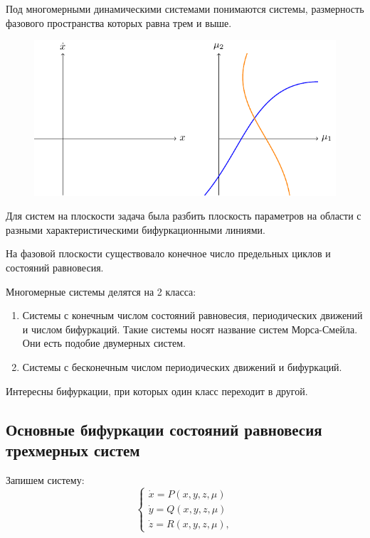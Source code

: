 Под многомерными динамическими системами понимаются системы, размерность фазового пространства которых равна трем и выше. 
\begin{figure} 
	\vspace{0.1em}
	\centering
	\includegraphics[scale=1]{fig/fig48.pdf}
	\vspace{-0.25em}
\end{figure}
Для систем на плоскости задача была разбить плоскость параметров на области с разными характеристическими бифуркационными линиями.

На фазовой плоскости существовало конечное число предельных циклов и состояний равновесия.

Многомерные системы делятся на 2 класса:
\begin{enumerate}
	\item Системы с конечным числом состояний равновесия, периодических движений и числом бифуркаций. Такие системы носят название систем Морса-Смейла. Они есть подобие двумерных систем.
	\item Системы с бесконечным числом периодических движений и бифуркаций. 
\end{enumerate}

Интересны бифуркации, при которых один класс переходит в другой.

\subsection{Основные бифуркации состояний равновесия трехмерных систем}
Запишем систему:
\begin{equation}
	\begin{cases}
		\dot x = P(x, y, z, \mu) \\
		\dot y = Q(x, y, z, \mu) \\
		\dot z = R(x, y, z, \mu),
	\end{cases}
	\label{eq:107}	
\end{equation}

